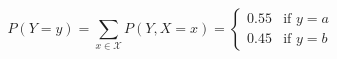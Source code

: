 \[
P(Y=y) = \sum_{x \in \mathcal{X}}^{} P(Y, X=x) = 
    \begin{cases}
        0.55 &\text{if } y=a \\
        0.45 &\text{if } y=b
    \end{cases}
\]